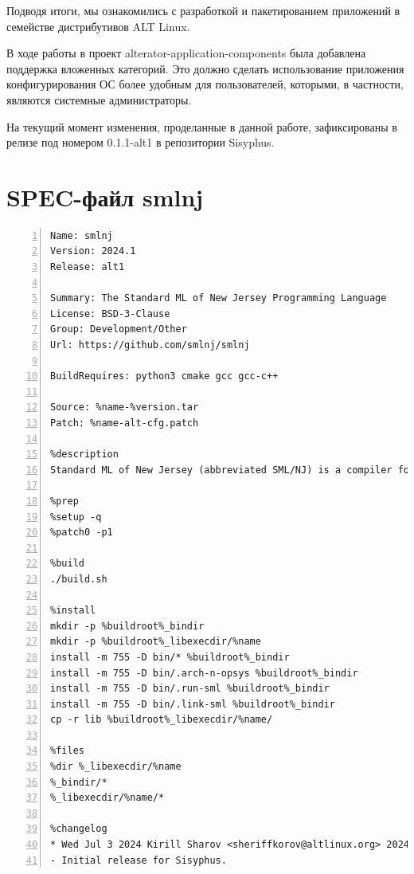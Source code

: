 \documentclass[bachelor, och, pract]{SCWorks}
\begin{document}
\newpage

\conclusion

Подводя итоги, мы ознакомились с разработкой и пакетированием приложений в семействе дистрибутивов ALT Linux.

В ходе работы в проект alterator-application-components была добавлена поддержка вложенных категорий.
Это должно сделать использование приложения конфигурирования ОС более удобным для пользователей, которыми, в частности, являются системные администраторы.

На текущий момент изменения, проделанные в данной работе, зафиксированы в релизе под номером 0.1.1-alt1 в репозитории Sisyphus.

%





\appendix

\section{SPEC-файл smlnj}\label{spec}

\begin{Verbatim}[fontsize=\small,breaklines=true,numbers=left] 
Name: smlnj
Version: 2024.1
Release: alt1

Summary: The Standard ML of New Jersey Programming Language
License: BSD-3-Clause
Group: Development/Other
Url: https://github.com/smlnj/smlnj

BuildRequires: python3 cmake gcc gcc-c++

Source: %name-%version.tar
Patch: %name-alt-cfg.patch 

%description
Standard ML of New Jersey (abbreviated SML/NJ) is a compiler for the Standard ML '97 programming language with associated libraries, tools, and documentation. SML/NJ is free, open source software.

%prep
%setup -q
%patch0 -p1

%build
./build.sh

%install
mkdir -p %buildroot%_bindir
mkdir -p %buildroot%_libexecdir/%name
install -m 755 -D bin/* %buildroot%_bindir
install -m 755 -D bin/.arch-n-opsys %buildroot%_bindir
install -m 755 -D bin/.run-sml %buildroot%_bindir
install -m 755 -D bin/.link-sml %buildroot%_bindir
cp -r lib %buildroot%_libexecdir/%name/

%files
%dir %_libexecdir/%name
%_bindir/*
%_libexecdir/%name/*

%changelog
* Wed Jul 3 2024 Kirill Sharov <sheriffkorov@altlinux.org> 2024.1-alt1
- Initial release for Sisyphus.
\end{Verbatim}
\end{document}
